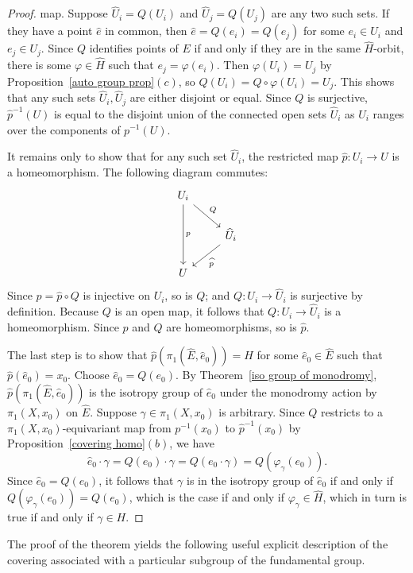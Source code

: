 \begin{proof}
map. Suppose $\widehat{U}_i=Q(U_i)$ and $\widehat{U}_j=Q(U_j)$ are any two such sets. If they have a point $\widehat{e}$ in common, then $\widehat{e}=Q(e_i)=Q(e_j)$ for some $e_i\in U_i$ and $e_j\in U_j$. Since $Q$ identifies points of $E$ if and only if they are in the same $\widehat{H}$-orbit, there is some $\varphi\in\widehat{H}$ such that $e_j=\varphi(e_i)$. Then $\varphi(U_i)=U_j$ by Proposition~\ref{auto group prop}$(c)$, so $Q(U_i)=Q\circ\varphi(U_i)=U_j$. This shows that any such sets $\widehat{U}_i,\widehat{U}_j$ are either disjoint or equal. Since $Q$ is surjective, $\widehat{p}^{-1}(U)$ is equal to the disjoint union of the connected open sets $\widehat{U}_i$ as $U_i$ ranges over the components of $p^{-1}(U)$.\par 
It remains only to show that for any such set $\widehat{U}_i$, the restricted map $\widehat{p}:U_i\to U$ is a homeomorphism. The following diagram commutes:
\[\begin{tikzcd}
U_i\ar[dd,"p"]\ar[rd,"Q"]&\\
&\widehat{U}_i\ar[ld,"\widehat{p}"]\\
U&
\end{tikzcd}\]
Since $p=\widehat{p}\circ Q$ is injective on $U_i$, so is $Q$; and $Q:U_i\to\widehat{U}_i$ is surjective by definition. Because $Q$ is an open map, it follows that $Q:U_i\to\widehat{U}_i$ is a homeomorphism. Since $p$ and $Q$ are homeomorphisms, so is $\widehat{p}$.\par
The last step is to show that $\widehat{p}(\pi_1(\widehat{E},\widehat{e}_0))=H$ for some $\widehat{e}_0\in\widehat{E}$ such that $\widehat{p}(\widehat{e}_0)=x_0$. Choose $\widehat{e}_0=Q(e_0)$. By Theorem~\ref{iso group of monodromy}, $\widehat{p}(\pi_1(\widehat{E},\widehat{e}_0))$ is the isotropy group of $\widehat{e}_0$ under the monodromy action by $\pi_1(X,x_0)$ on $\widehat{E}$. Suppose $\gamma\in\pi_1(X,x_0)$ is arbitrary. Since $Q$ restricts to a $\pi_1(X,x_0)$-equivariant map from $p^{-1}(x_0)$ to $\widehat{p}^{-1}(x_0)$ by Proposition~\ref{covering homo}$(b)$, we have
\[\widehat{e}_0\cdot\gamma=Q(e_0)\cdot\gamma=Q(e_0\cdot\gamma)=Q(\varphi_\gamma(e_0)).\]
Since $\widehat{e}_0=Q(e_0)$, it follows that $\gamma$ is in the isotropy group of $\widehat{e}_0$ if and only if $Q(\varphi_\gamma(e_0))=Q(e_0)$, which is the case if and only if $\varphi_\gamma\in\widehat{H}$, which in turn is true if and only if $\gamma\in H$.
\end{proof}
The proof of the theorem yields the following useful explicit description of the covering associated with a particular subgroup of the fundamental group.
